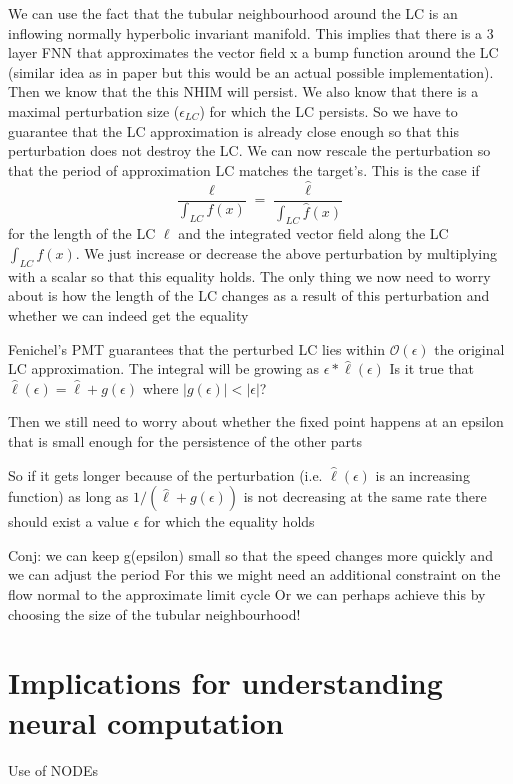 \documentclass{article}
\theoremstyle{definition}
\theoremstyle{remark}
\begin{document}
We can use the fact that the tubular neighbourhood around the LC is an inflowing normally hyperbolic invariant manifold.
This implies that there is a 3 layer FNN that approximates the vector field x a bump function around the LC (similar idea as in paper but this would be an actual possible implementation).
Then we know that the this NHIM will persist.
We also know that there is a maximal perturbation size ($\epsilon_{LC}$) for which the LC persists.
So we have to guarantee that the LC approximation is already close enough so that this perturbation does not destroy the LC.
We can now rescale the perturbation so that the period of approximation LC matches the target's. This is the case if 
\[\frac{\ell}{\int_{LC}f(x)} =  \frac{\hat \ell}{\int_{LC}\hat f(x)}\] for the length of the LC $\ell$ and the integrated vector field along the LC $\int_{LC}f(x)$.
We just increase or decrease  the above perturbation by multiplying with a scalar so that this equality holds.
The only thing we now need to worry about is how the length of the LC changes as a result of this perturbation and whether we can indeed get the equality 

Fenichel's PMT guarantees that the perturbed LC lies within $\mathcal{O}(\epsilon)$ the original LC approximation.
The integral will be growing as $\epsilon * \hat \ell(\epsilon)$
Is it true that $\hat \ell(\epsilon) = \hat \ell + g(\epsilon)$ where $|g(\epsilon)|<|\epsilon|$?

Then we still need to worry about whether the fixed point happens at an epsilon that is small enough for the persistence of the other parts


So if it gets longer because of the perturbation (i.e. $\hat \ell(\epsilon)$ is an increasing function) as long as $1/(\hat \ell+g(\epsilon))$ is not decreasing at the same rate there should exist a value $\epsilon$ for which the equality holds

Conj: we can keep g(epsilon) small so that the speed changes more quickly and we can adjust the period
For this we might need an additional constraint on the flow normal to the approximate limit cycle
Or we can perhaps achieve this by choosing the size of the tubular neighbourhood!




\section{Implications for understanding neural computation}

Use of NODEs \citep{kim2021inferring}
\end{document}
